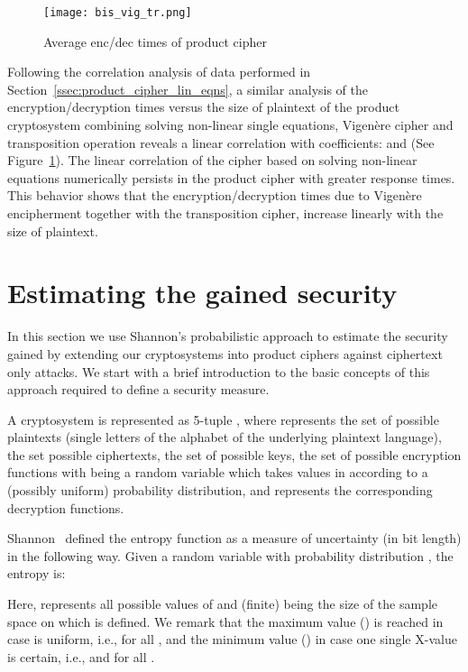 \documentclass[10pt,journal]{IEEEtran}
\begin{document}
\begin{figure}[H]
\centering
\texttt{[image: bis\_vig\_tr.png]}
\caption{Average enc/dec times of product cipher}
\label{fig:bis_vig_tr_times}
\end{figure}

Following the correlation analysis of data performed in
Section~\ref{ssec:product_cipher_lin_eqns}, a similar analysis of the
encryption/decryption times versus the size of plaintext of the
product cryptosystem combining solving non-linear single equations,
Vigen\`ere cipher and transposition operation reveals a linear
correlation with coefficients:  and
 (See Figure~\ref{fig:bis_vig_tr_times}). 
The linear correlation of the cipher based on
solving non-linear equations numerically
persists in the product cipher with greater response times. This behavior 
shows that the encryption/decryption times due to Vigen\`ere encipherment
together with the transposition cipher, increase linearly with the size of 
plaintext.

\section{Estimating the gained security} \label{sec:measure}
In this section we use Shannon's probabilistic approach to estimate
the security gained by extending our cryptosystems into product ciphers
against ciphertext only attacks. We start with a brief introduction to
the basic concepts of this approach required to define a security measure.
\newline

A cryptosystem is represented as 5-tuple ,
where  represents the set of possible plaintexts 
(single letters of the alphabet of the underlying plaintext language), 
 the set possible ciphertexts,  the set of 
possible keys,  the set of possible encryption functions with 
 being a random variable which takes values in  
according to a (possibly uniform) probability distribution, and
 represents the corresponding decryption functions. 
\newline

Shannon~\cite{shannon-1948} defined the entropy function as a measure 
of uncertainty (in bit length) in the following way. Given a random variable 
 with probability distribution , the entropy  is:


Here,  represents all possible values of  and (finite)  being the
size of the sample space on which  is defined. We remark that 
the maximum value () is reached in case  
is uniform, i.e.,  for all , and the minimum
value () in case one single X-value is certain, i.e., 
 and  for all .
\newline
\end{document}
